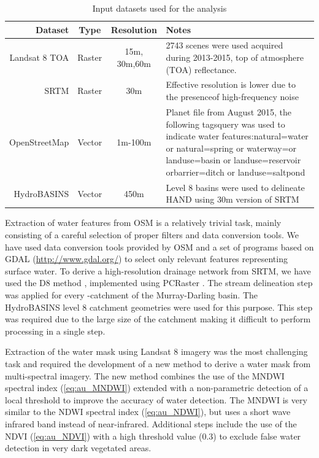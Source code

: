 \begin{table}
	\centering
	\caption{Input datasets used for the analysis}
	\label{table:au-datasets}
	\small
	\begin{tabular}{| r | c | c | C{7cm} |}
		\hline
		\textbf{Dataset} & \textbf{Type} & \textbf{Resolution} & \textbf{Notes} \\ 
		\hline
		Landsat 8 TOA & Raster & 15m, 30m,60m & 2743 scenes were used acquired during 2013-2015, top of atmosphere (TOA) reflectance. \\
		\hline
		\gls{SRTM} & Raster & 30m & Effective resolution is lower due to the presenceof high-frequency noise \\ 
		\hline
		OpenStreetMap & Vector & 1m-100m & Planet file from August 2015, the following tagsquery was used to indicate water features:natural=water or natural=spring or waterway=or landuse=basin or landuse=reservoir orbarrier=ditch or landuse=saltpond \\
		\hline
		HydroBASINS & Vector & 450m & Level 8 basins were used to delineate \gls{HAND} using 30m version of \gls{SRTM} \\
		\hline
	\end{tabular}
\end{table}

Extraction of water features from OSM is a relatively trivial task, mainly consisting of a careful selection of proper filters and data conversion tools. We have used data conversion tools provided by OSM and a set of programs based on GDAL (\url{http://www.gdal.org/}) to select only relevant features representing surface water. 
To derive a high-resolution drainage network from \gls{SRTM}, we have used the D8 method \citet{OCallaghan1984}, implemented using PCRaster \citet{Karssenberg2010}. The stream delineation step was applied for every -catchment of the Murray-Darling basin. The HydroBASINS level 8 catchment geometries were used for this purpose. This step was required due to the large size of the catchment making it difficult to perform processing in a single step.

Extraction of the water mask using Landsat 8 imagery was the most challenging task and required the development of a new method to derive a water mask from multi-spectral imagery. The new method combines the use of the \gls{MNDWI} spectral index (\ref{eq:au_MNDWI}) extended with a non-parametric detection of a local threshold to improve the accuracy of water detection. The \gls{MNDWI} is very similar to the \gls{NDWI} spectral index (\ref{eq:au_NDWI}), but uses a short wave infrared band instead of near-infrared. Additional steps include the use of the \gls{NDVI} \citet{Tucker1979} (\ref{eq:au_NDVI}) with a high threshold value (0.3) to exclude false water detection in very dark vegetated areas. 

